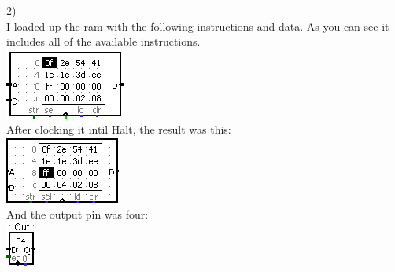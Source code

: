\documentclass{article}
\begin{document}
\begin{itemize}
    2)\\
    I loaded up the ram with the following instructions and data. As you can see it includes all of the available instructions.\\
    \includegraphics[scale=1]{snip1.PNG}\\
    After clocking it intil Halt, the result was this:\\
    \includegraphics[scale=1]{snip2.PNG}\\
    And the output pin was four:\\
    \includegraphics[scale=1]{snip3.PNG}\\
\end{itemize}
\end{document}
